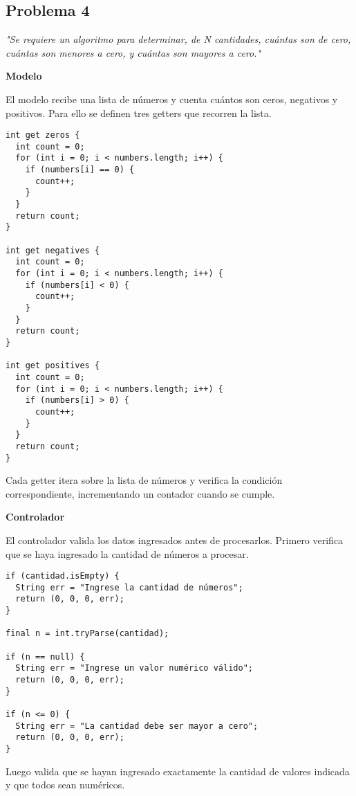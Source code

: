 \subsection{Problema 4}

\textit {"Se requiere un algoritmo para determinar, de N cantidades, cuántas son de cero, cuántas son menores a cero, y cuántas son mayores a cero."}

\textbf{Modelo}

El modelo recibe una lista de números y cuenta cuántos son ceros, negativos y positivos. Para ello se definen tres getters que recorren la lista.

\begin{center}
\begin{lstlisting}
int get zeros {
  int count = 0;
  for (int i = 0; i < numbers.length; i++) {
    if (numbers[i] == 0) {
      count++;
    }
  }
  return count;
}

int get negatives {
  int count = 0;
  for (int i = 0; i < numbers.length; i++) {
    if (numbers[i] < 0) {
      count++;
    }
  }
  return count;
}

int get positives {
  int count = 0;
  for (int i = 0; i < numbers.length; i++) {
    if (numbers[i] > 0) {
      count++;
    }
  }
  return count;
}
\end{lstlisting}
\end{center}

Cada getter itera sobre la lista de números y verifica la condición correspondiente, incrementando un contador cuando se cumple.

\textbf{Controlador}

El controlador valida los datos ingresados antes de procesarlos. Primero verifica que se haya ingresado la cantidad de números a procesar.

\begin{center}
\begin{lstlisting}
if (cantidad.isEmpty) {
  String err = "Ingrese la cantidad de números";
  return (0, 0, 0, err);
}

final n = int.tryParse(cantidad);

if (n == null) {
  String err = "Ingrese un valor numérico válido";
  return (0, 0, 0, err);
}

if (n <= 0) {
  String err = "La cantidad debe ser mayor a cero";
  return (0, 0, 0, err);
}
\end{lstlisting}
\end{center}

Luego valida que se hayan ingresado exactamente la cantidad de valores indicada y que todos sean numéricos.

